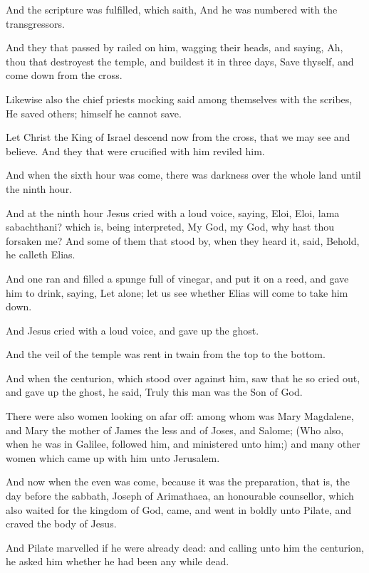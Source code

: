 \Verse And the scripture was fulfilled, which saith, And he was numbered with the transgressors.

\Verse And they that passed by railed on him, wagging their heads, and saying, Ah, thou that destroyest the temple, and buildest it in three days, \Verse Save thyself, and come down from the cross.

\Verse Likewise also the chief priests mocking said among themselves with the scribes, He saved others; himself he cannot save.

\Verse Let Christ the King of Israel descend now from the cross, that we may see and believe. And they that were crucified with him reviled him.

\Verse And when the sixth hour was come, there was darkness over the whole land until the ninth hour.

\Verse And at the ninth hour Jesus cried with a loud voice, saying, Eloi, Eloi, lama sabachthani? which is, being interpreted, My God, my God, why hast thou forsaken me?  \Verse And some of them that stood by, when they heard it, said, Behold, he calleth Elias.

\Verse And one ran and filled a spunge full of vinegar, and put it on a reed, and gave him to drink, saying, Let alone; let us see whether Elias will come to take him down.

\Verse And Jesus cried with a loud voice, and gave up the ghost.

\Verse And the veil of the temple was rent in twain from the top to the bottom.

\Verse And when the centurion, which stood over against him, saw that he so cried out, and gave up the ghost, he said, Truly this man was the Son of God.

\Verse There were also women looking on afar off: among whom was Mary Magdalene, and Mary the mother of James the less and of Joses, and Salome; \Verse (Who also, when he was in Galilee, followed him, and ministered unto him;) and many other women which came up with him unto Jerusalem.

\Verse And now when the even was come, because it was the preparation, that is, the day before the sabbath, \Verse Joseph of Arimathaea, an honourable counsellor, which also waited for the kingdom of God, came, and went in boldly unto Pilate, and craved the body of Jesus.

\Verse And Pilate marvelled if he were already dead: and calling unto him the centurion, he asked him whether he had been any while dead.

